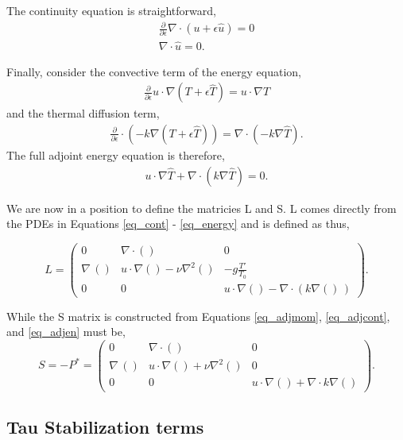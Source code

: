 \documentclass{article}
\begin{document}
The continuity equation is straightforward, 
\begin{align}
 \frac{\partial}{\partial \epsilon} \nabla \cdot (u + \epsilon \hat
 u) = 0 \\
\nabla \cdot \hat u = 0.
\label{eq_adjcont}
\end{align}

Finally, consider the convective term of the energy equation, 
\begin{align}
 \frac{\partial}{\partial \epsilon} u \cdot \nabla (T + \epsilon \hat T)
 = u \cdot \nabla \hat T
\end{align}
and the thermal diffusion term, 
\begin{align}
 \frac{\partial}{\partial \epsilon} \cdot (-k \nabla (T + \epsilon \hat
 T)) = \nabla \cdot (-k \nabla \hat T).
\end{align}
The full adjoint energy equation is therefore, 
\begin{align}
 u \cdot \nabla \hat T + \nabla \cdot (k \nabla \hat T) =0.
\label{eq_adjen}
\end{align}

We are now in a position to define the matricies L and S. L comes
directly from the PDEs in Equations \ref{eq_cont} - \ref{eq_energy} and is
defined as thus, 

\begin{equation}
\renewcommand\arraystretch{2}
 L = 
  \begin{pmatrix}
    0 & \nabla \cdot () & 0   \\
    \nabla \,() & u \cdot \nabla() - \nu \nabla^2() & -g \frac{T'}{T_0}  \\
    0 & 0 & u \cdot \nabla() - \nabla \cdot (k \nabla() \,)
  \end{pmatrix}.
\end{equation}

While the S matrix is constructed from Equations
\ref{eq_adjmom}, \ref{eq_adjcont}, and \ref{eq_adjen} must be, 
\begin{equation}
\renewcommand\arraystretch{2}
 S = -P^* = 
  \begin{pmatrix}
    0 & \nabla \cdot () & 0   \\
    \nabla \,() & u \cdot \nabla() + \nu \nabla^2() & 0  \\
    0 & 0 & u \cdot \nabla() + \nabla \cdot k \nabla()
  \end{pmatrix}.
\end{equation}

%
%
\newpage
\subsection{Tau Stabilization terms}
\end{document}
